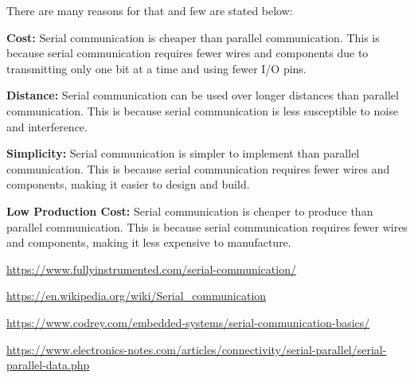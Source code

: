 \documentclass[a4paper]{exam}
\begin{document}
    \begin{questions}
        \begin{solution}
            There are many reasons for that and few are stated below:
            \begin{parts}
                \item \textbf{Cost:} Serial communication is cheaper than parallel communication. This is because serial communication requires fewer wires and components due to transmitting only one bit at a time and using fewer I/O pins.
                \item \textbf{Distance:} Serial communication can be used over longer distances than parallel communication. This is because serial communication is less susceptible to noise and interference.
                \item \textbf{Simplicity:} Serial communication is simpler to implement than parallel communication. This is because serial communication requires fewer wires and components, making it easier to design and build.
                \item \textbf{Low Production Cost:} Serial communication is cheaper to produce than parallel communication. This is because serial communication requires fewer wires and components, making it less expensive to manufacture.
            \end{parts}

            \begin{thebibliography}{9} 
                \url{https://www.fullyinstrumented.com/serial-communication/}
                
                \url{https://en.wikipedia.org/wiki/Serial_communication}

                \url{https://www.codrey.com/embedded-systems/serial-communication-basics/}

                \url{https://www.electronics-notes.com/articles/connectivity/serial-parallel/serial-parallel-data.php}
            \end{thebibliography}
        \end{solution}


\end{questions}
\end{document}
